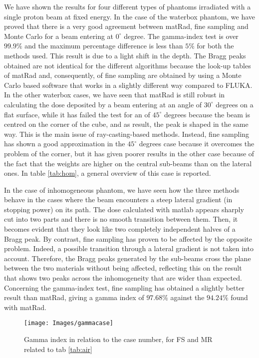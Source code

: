 \documentclass[12pt, a4paper, twoside]{book}
\begin{document}
We have shown the results for four different types of phantoms irradiated with a single proton beam at fixed energy.
In the case of the waterbox phantom, we have proved that there is a very good agreement between matRad, fine sampling and Monte Carlo for a beam entering at $0^\circ$ degree. The gamma-index test is over $99.9\%$ and the maximum percentage difference is less than $5\%$ for both the methods used. This result is due to a light shift in the depth.
The Bragg peaks obtained are not identical for the different algorithms because the look-up tables of matRad and, consequently, of fine sampling are obtained by using a Monte Carlo based software that works in a slightly different way compared to FLUKA.
In the other waterbox cases, we have seen that matRad is still robust in calculating the dose deposited by a beam entering at an angle of $30^\circ$ degrees on a flat surface, while it has failed the test for an  of $45^\circ$ degrees because the beam is centred on the corner of the cube, and as result, the peak is shaped in the same way. This is the main issue of ray-casting-based methods. Instead, fine sampling has shown a good approximation in the $45^\circ$ degrees case because it overcomes the problem of the corner, but it has given poorer results in the other case because of the fact that the weights are higher on the central sub-beams than on the lateral ones. In table \ref{tab:hom}, a general overview of this case is reported.

In the case of inhomogeneous phantom, we have seen how the three methods behave in the cases where the beam encounters a steep lateral gradient (in stopping power) on its path. The dose calculated with matlab appears sharply cut into two parts and there is no smooth transition between them. Then, it becomes evident that they look like two completely independent halves of a Bragg peak.
By contrast, fine sampling has proven to be affected by the opposite problem. Indeed, a possible transition through a lateral gradient is not taken into account. Therefore, the Bragg peaks generated by the sub-beams cross the plane between the two materials without being affected, reflecting this on the result that shows two peaks across the inhomogeneity that are wider than expected. Concerning the gamma-index test, fine sampling has obtained a slightly better result than matRad, giving a gamma index of $97.68\%$ against the $94.24\%$ found with matRad.

\begin{figure}[!t]
\centering
{\texttt{[image: Images/gammacase]}} 
\caption{Gamma index in relation to the case number, for FS and MR related to tab \ref{tab:air}}
\label{fig:gamcase}
\end{figure}
\end{document}
